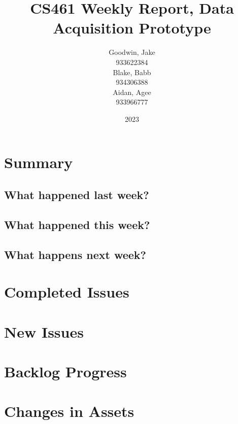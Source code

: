 \documentclass{article}
\title{CS461 Weekly Report, Data Acquisition Prototype}
\author{
    Goodwin, Jake\\
    933622384\\
    
    Blake, Babb\\
    934306388\\
    
    Aidan, Agee\\
    933966777\\
}
\date{2023}
\begin{document}
\section{Summary}


\subsection{What happened last week?}

\subsection{What happened this week?}

\subsection{What happens next week?}


\section{Completed Issues}





\section{New Issues}



\section{Backlog Progress}



\section{Changes in Assets}
\end{document}
